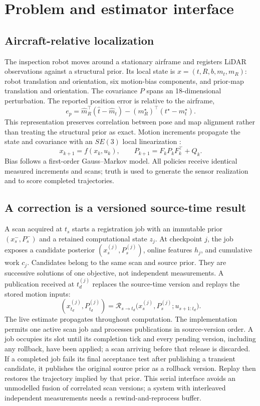 \section{Problem and estimator interface}\label{sec:problem}
\subsection{Aircraft-relative localization}
The inspection robot moves around a stationary airframe and registers LiDAR observations against a structural prior. Its local state is $x=(t,R,b,m_t,m_R)$: robot translation and orientation, six motion-bias components, and prior-map translation and orientation. The covariance $P$ spans an 18-dimensional perturbation. The reported position error is relative to the airframe,
\begin{equation}
e_p=\widehat m_R^\top(\widehat t-\widehat m_t)-(m_R^\star)^\top(t^\star-m_t^\star).
\label{eq:relative-error}
\end{equation}
This representation preserves correlation between pose and map alignment rather than treating the structural prior as exact. Motion increments propagate the state and covariance with an $SE(3)$ local linearization \cite{barfoot2014}:
\begin{equation}
x_{k+1}=f(x_k,u_k),\qquad P_{k+1}=F_kP_kF_k^\top+Q_k.\label{eq:propagation}
\end{equation}
Bias follows a first-order Gauss--Markov model. All policies receive identical measured increments and scans; truth is used to generate the sensor realization and to score completed trajectories.

\subsection{A correction is a versioned source-time result}
A scan acquired at $t_s$ starts a registration job with an immutable prior $(x_s^-,P_s^-)$ and a retained computational state $z_j$. At checkpoint $j$, the job exposes a candidate posterior $(x_s^{(j)},P_s^{(j)})$, online features $h_j$, and cumulative work $c_j$. Candidates belong to the same scan and source prior. They are successive solutions of one objective, not independent measurements. A publication received at $t_d^{(j)}$ replaces the source-time version and replays the stored motion inputs:
\begin{equation}
(x_{t_d}^{(j)},P_{t_d}^{(j)})=\mathcal R_{s\to t_d}\bigl(x_s^{(j)},P_s^{(j)};u_{s+1:t_d}\bigr).\label{eq:replay}
\end{equation}
The live estimate propagates throughout computation. The implementation permits one active scan job and processes publications in source-version order. A job occupies its slot until its completion tick and every pending version, including any rollback, have been applied; a scan arriving before that release is discarded. If a completed job fails its final acceptance test after publishing a transient candidate, it publishes the original source prior as a rollback version. Replay then restores the trajectory implied by that prior. This serial interface avoids an unmodelled fusion of correlated scan versions; a system with interleaved independent measurements needs a rewind-and-reprocess buffer.

